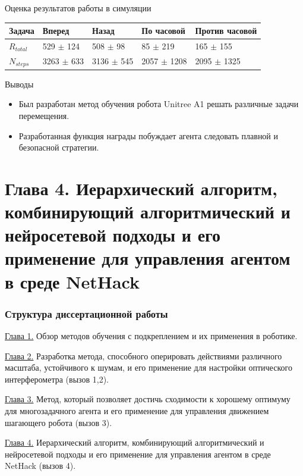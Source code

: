 \begin{frame}{Оценка результатов работы в симуляции}
\begin{table} [htbp]
\begin{threeparttable}
\begin{tabular}{| p{1cm} || p{2cm} | p{2cm} | p{2cm} |p{2cm} |}
            \hline
            \hline
            Задача & Вперед & Назад & По часовой & Против часовой \\
            \hline
            $R_{total}$ &	529 $\pm$ 124 &	508 $\pm$ 98 &	85 $\pm$ 219 &	165 $\pm$ 155 \\
            $N_{steps}$ & 3263 $\pm$ 633 &	3136 $\pm$ 545 &	2057 $\pm$ 1208 &	2095 $\pm$ 1325 \\
            \hline
            \hline
        \end{tabular}
    \end{threeparttable}
\end{table}
\end{frame}

\begin{frame}{Выводы}
\begin{itemize}
    \item[\textcolor{ForestGreen}{\checkmark}] Был разработан метод обучения робота Unitree A1 решать различные задачи перемещения.
    \item[\textcolor{ForestGreen}{\checkmark}] Разработанная функция награды побуждает агента следовать плавной и безопасной стратегии.
\end{itemize}
\end{frame}



\section{Глава 4. Иерархический алгоритм, комбинирующий алгоритмический и
нейросетевой подходы и его применение для управления агентом в среде NetHack}


\begin{frame}
    \frametitle{Структура диссертационной работы}
    \begin{itemize}
        \item \underline{Глава 1.} Обзор методов обучения с подкреплением и их применения в роботике. 
        \item \underline{Глава 2.} Разработка метода, способного оперировать действиями различного масштаба, устойчивого к шумам, и его применение для настройки оптического интерферометра (вызов 1,2).
        \item \underline{Глава 3.} Метод, который позволяет достичь сходимости к хорошему оптимуму для многозадачного агента и его применение  для управления движением шагающего робота (вызов 3).
        {\color{orange}\item \underline{Глава 4.} Иерархический алгоритм, комбинирующий алгоритмический и нейросетевой подходы и его применение для управления агентом в среде NetHack (вызов 4).}
    \end{itemize}
\end{frame}

